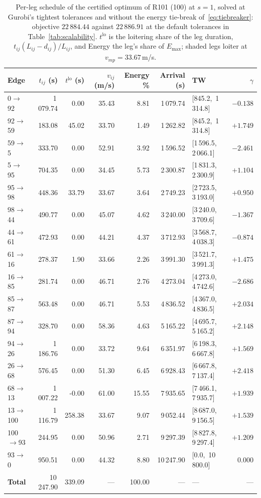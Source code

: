 \documentclass[11pt]{article}
\begin{document}
\begin{table}[H]
\centering\scriptsize
\setlength{\tabcolsep}{4pt}
\caption{Per-leg schedule of the certified optimum of R101 (100) at $s = 1$, solved at Gurobi's tightest tolerances and without the energy tie-break of~\eqref{eq:tiebreaker}: objective $22\,884.44$ against $22\,886.91$ at the default tolerances in Table~\ref{tab:scalability}. $t^{\mathrm{lo}}$ is the loitering share of the leg duration, $t_{ij}(L_{ij} - d_{ij})/L_{ij}$, and Energy the leg's share of $E_{\max}$; shaded legs loiter at $v_{mp} = 33.67$\,m/s.}\label{tab:tour-r101-100}
\begin{tabular}{lrrrrrlr}
\toprule
Edge & $t_{ij}$ (s) & $t^{\mathrm{lo}}$ (s) & $v_{ij}$ (m/s) & Energy \% & Arrival (s) & TW & $\gamma$ \\
\midrule
0$\to$92 & 1\,079.74 & 0.00 & 35.43 & 8.81 & 1\,079.74 & [845.2,\, 1\,314.8] & $-0.138$ \\
\rowcolor{gray!12} 92$\to$59 & 183.08 & 45.02 & 33.70 & 1.49 & 1\,262.82 & [845.2,\, 1\,314.8] & $+1.749$ \\
59$\to$5 & 333.70 & 0.00 & 52.91 & 3.92 & 1\,596.52 & [1\,596.5,\, 2\,066.1] & $-2.461$ \\
5$\to$95 & 704.35 & 0.00 & 34.45 & 5.73 & 2\,300.87 & [1\,831.3,\, 2\,300.9] & $+1.104$ \\
\rowcolor{gray!12} 95$\to$98 & 448.36 & 33.79 & 33.67 & 3.64 & 2\,749.23 & [2\,723.5,\, 3\,193.0] & $+0.950$ \\
98$\to$44 & 490.77 & 0.00 & 45.07 & 4.62 & 3\,240.00 & [3\,240.0,\, 3\,709.6] & $-1.367$ \\
44$\to$61 & 472.93 & 0.00 & 44.21 & 4.37 & 3\,712.93 & [3\,568.7,\, 4\,038.3] & $-0.874$ \\
\rowcolor{gray!12} 61$\to$16 & 278.37 & 1.90 & 33.66 & 2.26 & 3\,991.30 & [3\,521.7,\, 3\,991.3] & $+1.475$ \\
16$\to$85 & 281.74 & 0.00 & 46.71 & 2.76 & 4\,273.04 & [4\,273.0,\, 4\,742.6] & $-2.686$ \\
85$\to$87 & 563.48 & 0.00 & 46.71 & 5.53 & 4\,836.52 & [4\,367.0,\, 4\,836.5] & $+2.034$ \\
87$\to$94 & 328.70 & 0.00 & 58.36 & 4.63 & 5\,165.22 & [4\,695.7,\, 5\,165.2] & $+2.148$ \\
94$\to$26 & 1\,186.76 & 0.00 & 33.72 & 9.64 & 6\,351.97 & [6\,198.3,\, 6\,667.8] & $+1.569$ \\
26$\to$68 & 576.45 & 0.00 & 51.30 & 6.45 & 6\,928.43 & [6\,667.8,\, 7\,137.4] & $+2.418$ \\
68$\to$13 & 1\,007.22 & -0.00 & 61.00 & 15.55 & 7\,935.65 & [7\,466.1,\, 7\,935.7] & $+1.939$ \\
\rowcolor{gray!12} 13$\to$100 & 1\,116.79 & 258.38 & 33.67 & 9.07 & 9\,052.44 & [8\,687.0,\, 9\,156.5] & $+1.539$ \\
100$\to$93 & 244.95 & 0.00 & 50.96 & 2.71 & 9\,297.39 & [8\,827.8,\, 9\,297.4] & $+1.209$ \\
93$\to$0 & 950.51 & 0.00 & 44.32 & 8.80 & 10\,247.90 & [0.0,\, 10\,800.0] & $\phantom{+}0.000$ \\
\midrule
\textbf{Total} & 10\,247.90 & 339.09 & --- & 100.00 & --- & --- & --- \\
\bottomrule
\end{tabular}
\end{table}
\end{document}
